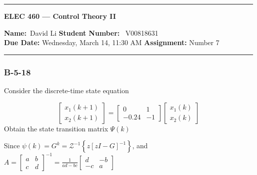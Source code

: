 \begin{center}
	\hrule
	\vspace{.4cm}
	{\textbf { \large ELEC 460 --- Control Theory II}}
\end{center}
{\textbf{Name:}\ David Li \hspace{\fill} \textbf{Student Number:}} \ V00818631  \\
{\textbf{Due Date:} Wednesday, March 14, 11:30 AM \hspace{\fill} \textbf{Assignment:} Number 7} \\
	\hrule
	
	
\subsubsection*{B-5-18}
Consider the discrete-time state equation

\[
\begin{bmatrix}
x_1(k+1) \\
x_2(k+1)
\end{bmatrix} = \begin{bmatrix}
0     &  1 \\
-0.24 & -1 
\end{bmatrix}\begin{bmatrix}
x_1(k) \\
x_2(k)
\end{bmatrix}
\]
Obtain the state transition matrix $\Psi(k)$

Since $\displaystyle \psi(k)=G^k= \mathcal{Z}^{-1} \left\{z[zI-G]^{-1}\right\}$, and $A=\begin{bmatrix}
a     &  b \\
c &  d 
\end{bmatrix}^{-1}= \frac{1}{ad-bc}\begin{bmatrix}
d     &  -b \\
-c &  a 
\end{bmatrix}$

